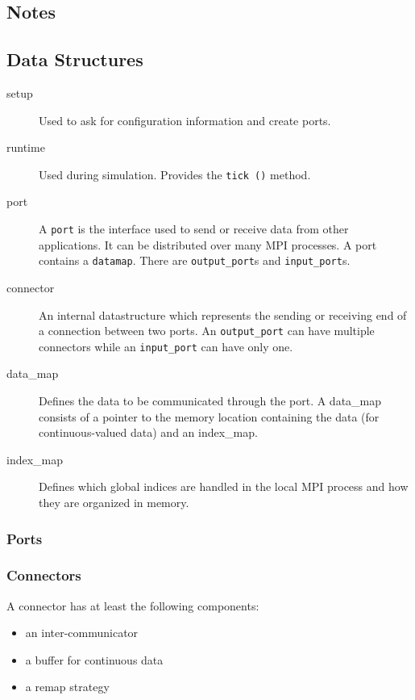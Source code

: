 \documentclass[a4paper]{report}
\begin{document}
\begin{metatext}
\chapter{Notes}

\section{Data Structures}

\begin{description}
  \item[setup] Used to ask for configuration information and create
    ports.
  \item[runtime] Used during simulation.  Provides the \lstinline|tick ()|
    method.
  \item[port] A \lstinline|port| is the interface used to send or receive
    data from other applications.  It can be distributed over many MPI
    processes.  A port contains a \lstinline|datamap|.  There are
    \lstinline|output_port|s and \lstinline|input_port|s.
  \item[connector] An internal datastructure which represents the
    sending or receiving end of a connection between two ports.  An
    \lstinline|output_port| can have multiple connectors while an
    \lstinline|input_port| can have only one.
  \item[data\_map] Defines the data to be communicated through the
    port.  A data\_map consists of a pointer to the memory location
    containing the data (for continuous-valued data) and an
    index\_map.
  \item[index\_map] Defines which global indices are handled in the
    local MPI process and how they are organized in memory.
\end{description}

\subsection{Ports}

\subsection{Connectors}

A connector has at least the following components:
\begin{itemize}
  \item an inter-communicator
  \item a buffer for continuous data
  \item a remap strategy
\end{itemize}


\end{metatext}
\end{document}
